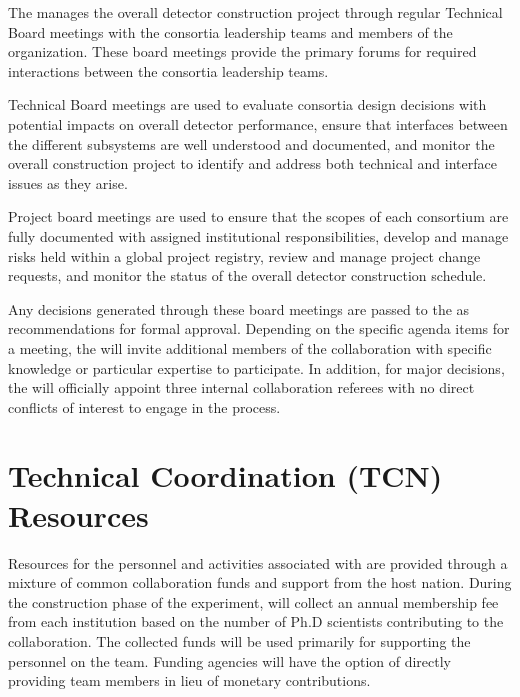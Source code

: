 
The  manages the overall detector construction project
through regular Technical Board meetings with the consortia leadership
teams and members of the  organization.  These board
meetings provide the primary forums for required interactions between
the consortia leadership teams.

Technical Board meetings are used to evaluate consortia design
decisions with potential impacts on overall detector performance,
ensure that interfaces between the different subsystems are well
understood and documented, and monitor the overall construction
project to identify and address both technical and interface issues as
they arise.

Project board meetings are used to ensure that the scopes of each
consortium are fully documented with assigned institutional
responsibilities, develop and manage risks held within a global
project registry, review and manage project change requests, and
monitor the status of the overall detector construction schedule.

Any decisions generated through these board meetings are passed to the
  as recommendations for formal approval.
Depending on the specific agenda items for a meeting, the
 will invite additional members of the collaboration
with specific knowledge or particular expertise to participate.  In
addition, for major decisions, the  will officially
appoint three internal collaboration referees with no direct conflicts
of interest to engage in the process.

\section{Technical Coordination (TCN) Resources}
\label{sec:tc_resources}

Resources for the personnel and activities associated with 
are provided through a mixture of common collaboration funds and
support from the host nation.  During the construction phase of the
experiment,  will collect an annual membership fee from
each institution based on the number of Ph.D scientists contributing
to the collaboration.  The collected funds will be used primarily for
supporting the personnel on the  team.  Funding agencies
will have the option of directly providing team members in lieu of
monetary contributions.

